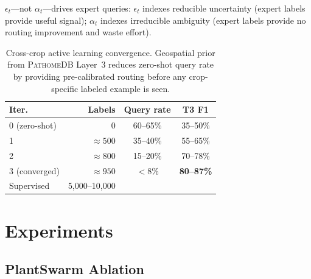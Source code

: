 \documentclass[11pt,twocolumn]{article}
\newcommand{\pathomedb}{\textsc{PathomeDB}\xspace}
\begin{document}
$\epsilon_t$---not $\alpha_t$---drives
expert queries: $\epsilon_t$ indexes
reducible uncertainty (expert labels provide
useful signal); $\alpha_t$ indexes irreducible
ambiguity (expert labels provide no routing
improvement and waste effort).

\begin{table}[t]\centering\small
\begin{tabular}{lrcc}
\toprule
\textbf{Iter.} & \textbf{Labels}
& \textbf{Query rate} & \textbf{T3 F1} \\
\midrule
0 (zero-shot) & 0         & 60--65\% & 35--50\% \\
1             & ${\approx}500$   & 35--40\% & 55--65\% \\
2             & ${\approx}800$   & 15--20\% & 70--78\% \\
3 (converged) & ${\approx}950$   & ${<}8\%$ & \textbf{80--87\%} \\
\midrule
Supervised & 5,000--10,000 & & \\
\bottomrule
\end{tabular}
\caption{Cross-crop active learning convergence.
  Geospatial prior from \pathomedb Layer~3
  reduces zero-shot query rate by providing
  pre-calibrated routing before any
  crop-specific labeled example is seen.}
\label{tab:active}
\end{table}

\section{Experiments}
\label{sec:exp}

\subsection{PlantSwarm Ablation}
\end{document}

